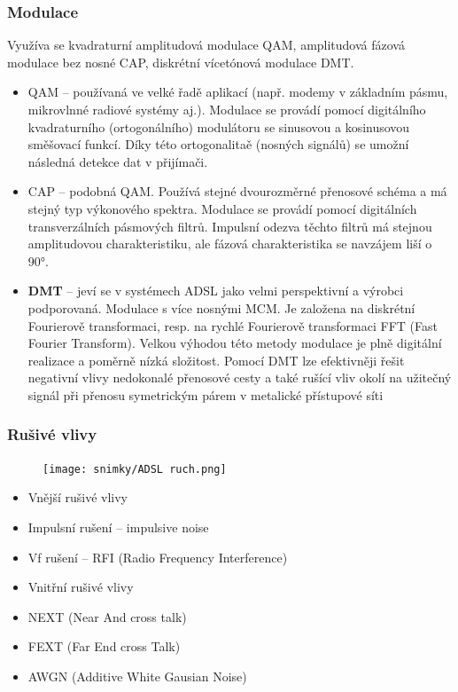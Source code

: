 \subsubsection{Modulace}
Využíva se kvadraturní amplitudová modulace QAM, amplitudová fázová modulace bez nosné CAP, diskrétní vícetónová modulace DMT.
\begin{itemize}
    \item QAM -- používaná ve velké řadě aplikací (např. modemy v základním pásmu, mikrovlnné radiové systémy aj.). Modulace se provádí pomocí digitálního kvadraturního (ortogonálního) modulátoru se sinusovou a kosinusovou směšovací funkcí. Díky této ortogonalitaě (nosných signálů) se umožní následná detekce dat v přijímači.
    \item CAP -- podobná QAM. Používá stejné dvourozměrné přenosové schéma a má stejný typ výkonového spektra. Modulace se provádí pomocí digitálních transverzálních pásmových filtrů. Impulsní odezva těchto filtrů má stejnou amplitudovou charakteristiku, ale fázová charakteristika se navzájem liší o 90°.
    \item \textbf{DMT} -- jeví se v systémech ADSL jako velmi perspektivní a výrobci podporovaná. Modulace s více nosnými MCM. Je založena na diskrétní Fourierově transformaci, resp. na rychlé Fourierově transformaci FFT (Fast Fourier Transform). Velkou výhodou této metody modulace je plně digitální realizace a poměrně nízká složitost. Pomocí DMT lze efektivněji řešit negativní vlivy nedokonalé přenosové cesty a také rušící vliv okolí na užitečný signál při přenosu symetrickým párem v metalické přístupové síti
\end{itemize}
\newpage

\subsubsection{Rušivé vlivy}
\begin{figure} [h]
    \centering
    \texttt{[image: snimky/ADSL ruch.png]}
    \label{fig:adsl-ruch}
\end{figure}
\begin{itemize}
    \item Vnější rušivé vlivy
    \item Impulsní rušení -- impulsive noise
    \item Vf rušení -- RFI (Radio Frequency Interference)
    \item Vnitřní rušivé vlivy
    \item NEXT (Near And cross talk)
    \item FEXT (Far End cross Talk)
    \item AWGN (Additive White Gausian Noise)
\end{itemize}

